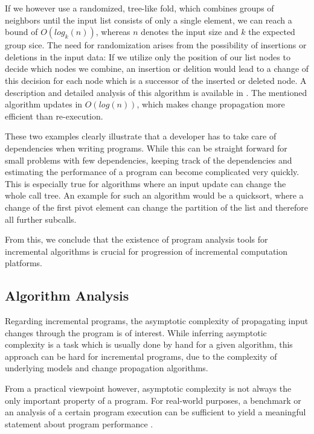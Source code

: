 If we however use a randomized, tree-like fold, which combines groups of neighbors until the input list consists of only a single element, we can reach a bound of $O(log_k(n))$, whereas $n$ denotes the input size and $k$ the expected group sice. 
The need for randomization arises from the possibility of insertions or deletions in the input data: If we utilize only the position of our list nodes to decide which nodes we combine, an insertion or delition would lead to a change of this decision for each node which is a successor of the inserted or deleted node. A description and detailed analysis of this algorithm is available in \cite{Acar2005thesis}. The mentioned algorithm updates in $O(log(n))$, which makes change propagation more efficient than re-execution. 

These two examples clearly illustrate that a developer has to take care of dependencies when writing programs. While this can be straight forward for small problems with few dependencies, keeping track of the dependencies and estimating the performance of a program can become complicated very quickly. This is especially true for algorithms where an input update can change the whole call tree. An example for such an algorithm would be a quicksort\cite{hoare1962quicksort}, where a change of the first pivot element can change the partition of the list and therefore all further subcalls. 

From this, we conclude that the existence of program analysis tools for incremental algorithms is crucial for progression of incremental computation platforms. 

\subsection{Algorithm Analysis}

Regarding incremental programs, the asymptotic complexity of propagating input changes through the program is of interest. While inferring asymptotic complexity is a task which is usually done by hand for a given algorithm, this approach can be hard for incremental programs, due to the complexity of underlying models and change propagation algorithms. 

From a practical viewpoint however, asymptotic complexity is not always the only important property of a program. For real-world purposes, a benchmark or an analysis of a certain program execution can be sufficient to yield a meaningful statement about program performance \cite{vokolos1998performance}.

